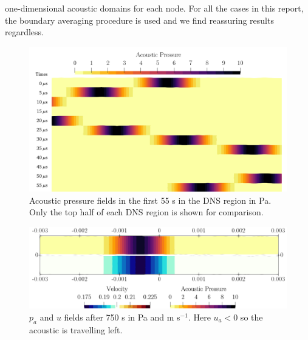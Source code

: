 one-dimensional acoustic domains for each node. For all the cases in this report, the boundary averaging procedure is used and we find reassuring results regardless.

\begin{figure}[t]
\centering
\includegraphics[scale=0.36]{assets/graphs/AC_BUMP_first_bounces_comp.png}
\caption{Acoustic pressure fields in the first 55 {\textmu}s in the DNS region in Pa. Only the top half of each DNS region is shown for comparison.}
\label{fig:ac-bump-dns}
\end{figure}

\begin{figure}[t]
\centering
\includegraphics[scale=0.36]{assets/graphs/AC_BUMP_ndt=150e-4_comp.png}
\caption{$p_a$ and $u$ fields after 750 {\textmu}s in Pa and m s$^{-1}$. Here $u_a < 0$ so the acoustic is travelling left.}
\label{fig:ac-bump-dns-late}
\end{figure}

